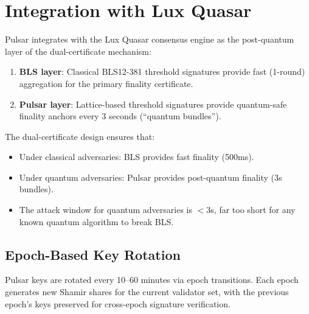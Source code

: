 \section{Integration with Lux Quasar}

\label{sec:integration}

Pulsar integrates with the Lux Quasar consensus engine as the post-quantum layer
of the dual-certificate mechanism:

\begin{enumerate}[nosep]
\item \textbf{BLS layer}: Classical BLS12-381 threshold signatures provide fast (1-round)
aggregation for the primary finality certificate.
\item \textbf{Pulsar layer}: Lattice-based threshold signatures provide quantum-safe
finality anchors every 3 seconds (``quantum bundles'').
\end{enumerate}

The dual-certificate design ensures that:
\begin{itemize}[nosep]
\item Under classical adversaries: BLS provides fast finality (500ms).
\item Under quantum adversaries: Pulsar provides post-quantum finality (3s bundles).
\item The attack window for quantum adversaries is $< 3$s, far too short for any known
quantum algorithm to break BLS.
\end{itemize}

\subsection{Epoch-Based Key Rotation}

Pulsar keys are rotated every 10--60 minutes via epoch transitions. Each epoch
generates new Shamir shares for the current validator set, with the previous epoch's
keys preserved for cross-epoch signature verification.

